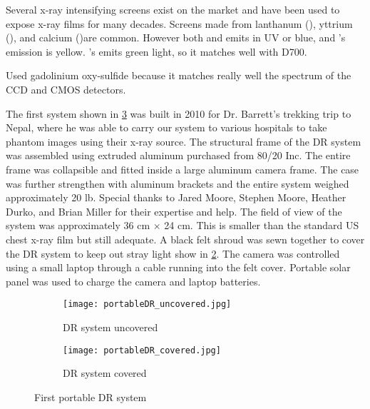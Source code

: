 Several x-ray intensifying screens exist on the market and have been used to expose x-ray films for many decades.  Screens made from lanthanum (), yttrium (), and calcium ()are common.  However both  and  emits in UV or blue, and 's emission is yellow.  's emits green light, so it matches well with D700.

Used gadolinium oxy-sulfide because it matches really well the spectrum of the CCD and CMOS detectors.

The first system shown in \ref{fig:DR1} was built in 2010 for Dr. Barrett's trekking trip to Nepal, where he was able to carry our system to various hospitals to take phantom images using their x-ray source. The structural frame of the DR system was assembled using extruded aluminum purchased from 80/20 Inc.  The entire frame was collapsible and fitted inside a large aluminum camera frame.  The case was further strengthen with aluminum brackets and the entire system weighed approximately 20 lb.  Special thanks to Jared Moore, Stephen Moore, Heather Durko, and Brian Miller for their expertise and help.  The field of view of the system was approximately 36 cm $\times$ 24 cm.  This is smaller than the standard US chest x-ray film but still adequate.  A black felt shroud was sewn together to cover the DR system to keep out stray light show in \ref{fig:DR1covered}.  The camera was controlled using a small laptop through a cable running into the felt cover.  Portable solar panel was used to charge the camera and laptop batteries.

\begin{figure}[ht]
\centering
	\begin{subfigure}[b]{0.4\linewidth}
	\texttt{[image: portableDR\_uncovered.jpg]}
	\caption{DR system uncovered}
	\label{fig:DR1uncovered}
	\end{subfigure}
\hspace{0.2cm}
	\begin{subfigure}[b]{0.4\linewidth}
	\centering
	\texttt{[image: portableDR\_covered.jpg]}
	\caption{DR system covered}
	\label{fig:DR1covered}
	\end{subfigure}
\caption{First portable DR system}
\label{fig:DR1}
\end{figure}


